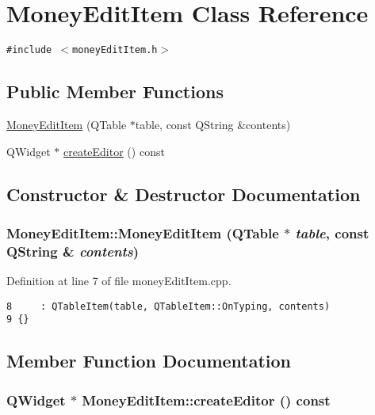 \hypertarget{classMoneyEditItem}{
\section{Money\-Edit\-Item Class Reference}
\label{classMoneyEditItem}
}
{\tt \#include $<$money\-Edit\-Item.h$>$}

\subsection*{Public Member Functions}
\begin{CompactItemize}
\item 
\hyperlink{classMoneyEditItem_a0}{Money\-Edit\-Item} (QTable $\ast$table, const QString \&contents)
\item 
QWidget $\ast$ \hyperlink{classMoneyEditItem_a1}{create\-Editor} () const
\end{CompactItemize}


\subsection{Constructor \& Destructor Documentation}
\hypertarget{classMoneyEditItem_a0}{
\subsubsection[MoneyEditItem]{\setlength{\rightskip}{0pt plus 5cm}Money\-Edit\-Item::Money\-Edit\-Item (QTable $\ast$ {\em table}, const QString \& {\em contents})}}
\label{classMoneyEditItem_a0}


Definition at line 7 of file money\-Edit\-Item.cpp.

\footnotesize\begin{verbatim}8     : QTableItem(table, QTableItem::OnTyping, contents)
9 {}
\end{verbatim}\normalsize 




\subsection{Member Function Documentation}
\hypertarget{classMoneyEditItem_a1}{
\subsubsection[createEditor]{\setlength{\rightskip}{0pt plus 5cm}QWidget $\ast$ Money\-Edit\-Item::create\-Editor () const}}
\label{classMoneyEditItem_a1}


